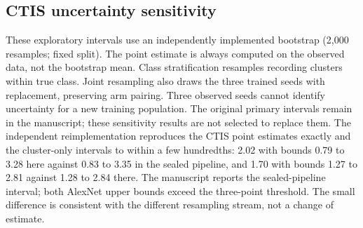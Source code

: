 \subsection{CTIS uncertainty sensitivity}

These exploratory intervals use an independently implemented bootstrap (2,000 resamples; fixed split). The point estimate is always computed on the observed data, not the bootstrap mean. Class stratification resamples recording clusters within true class. Joint resampling also draws the three trained seeds with replacement, preserving arm pairing. Three observed seeds cannot identify uncertainty for a new training population. The original primary intervals remain in the manuscript; these sensitivity results are not selected to replace them. The independent reimplementation reproduces the CTIS point estimates exactly and the cluster-only intervals to within a few hundredths: 2.02 with bounds 0.79 to 3.28 here against 0.83 to 3.35 in the sealed pipeline, and 1.70 with bounds 1.27 to 2.81 against 1.28 to 2.84 there. The manuscript reports the sealed-pipeline interval; both AlexNet upper bounds exceed the three-point threshold. The small difference is consistent with the different resampling stream, not a change of estimate.

